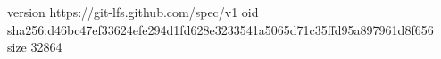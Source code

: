 version https://git-lfs.github.com/spec/v1
oid sha256:d46bc47ef33624efe294d1fd628e3233541a5065d71c35ffd95a897961d8f656
size 32864
